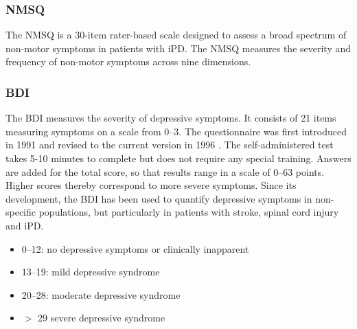 \QPsychometrics{}

\subsubsection{\acf{NMSQ}}
\label{questionnaires:NMSQ}
The \ac{NMSQ} is a 30-item rater-based scale designed to assess a broad spectrum of non-motor symptoms in patients with \ac{iPD}.
The \ac{NMSQ} measures the severity and frequency of non-motor symptoms across nine dimensions.

\subsubsection{\acf{BDI}}
\label{questionnaires:BDI}

The \acl{BDI} measures the severity of depressive symptoms. It consists of 21 items  measuring symptoms on a scale from 0--3. The questionnaire was first introduced in 1991 \cite{beck1987bdi1} and revised to the current version in 1996 \cite{beck1996bdi2}. The self-administered test takes 5-10 minutes to complete but does not require any special training. Answers are added for the total score, so that results range in a scale of 0--63 points. Higher scores thereby correspond to more severe symptoms. Since its development, the \ac{BDI} has been used to quantify depressive symptoms in non-specific populations, but particularly in patients with stroke, spinal cord injury and \ac{iPD}. 

\QScores{}
\begin{itemize}\itemsep2pt
\item 0--12: no depressive symptoms or clinically inapparent
\item 13--19: mild depressive syndrome
\item 20--28: moderate depressive syndrome
\item $>$ 29 severe depressive syndrome
\end{itemize}

\QPsychometrics{}

